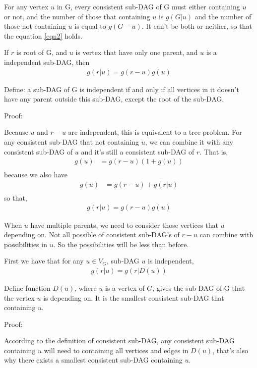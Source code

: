\documentclass[11pt]{article}
\begin{document}
	For any vertex $u$ in G, every consistent sub-DAG of G must either containing $u$ or not, and the number of those that containing $u$ is $g(G|u)$ and the number of those not containing $u$ is equal to $g(G-u)$. It can't be both or neither, so that the equation \ref{eqn2} holds.
	
	\bigskip
	If $r$ is root of G, and $u$ is vertex that have only one parent, and $u$ is a independent sub-DAG, then
	\begin{align} \label{eqn3}
		g(r|u) = g(r-u)g(u)
	\end{align}
	
	Define: a sub-DAG of G is independent if and only if all vertices in it doesn't have any parent outside this sub-DAG, except the root of the sub-DAG.
	
	\bigskip
	Proof:
	
	Because $u$ and $r-u$ are independent, this is equivalent to a tree problem. For any consistent sub-DAG that not containing $u$, we can combine it with any consistent sub-DAG of $u$ and it's still a consistent sub-DAG of $r$. That is,
	\begin{align*}
		g(u)&=g(r-u)(1+g(u))\\
	\end{align*}
	because we also have
	\begin{align*}
		g(u)&=g(r-u)+g(r|u)\\
	\end{align*}
	so that,
	\begin{align*}
		g(r|u) = g(r-u)g(u)
	\end{align*}
	
	\bigskip
	When $u$ have multiple parents, we need to consider those vertices that $u$ depending on. Not all possible of consistent sub-DAG's of $r-u$ can combine with possibilities in $u$. So the possibilities will be less than before.
	
	\bigskip
	First we have that for any $u \in V_G$, sub-DAG $u$ is independent,
	\begin{align}
		g(r|u) = g(r|D(u))
	\end{align}
	
	Define function $D(u)$, where $u$ is a vertex of $G$, gives the sub-DAG of G that the vertex $u$ is depending on. It is the smallest consistent sub-DAG that containing $u$.
	
	\bigskip
	Proof:
	
	According to the definition of consistent sub-DAG, any consistent sub-DAG containing $u$ will need to containing all vertices and edges in $D(u)$, that's also why there exists a smallest consistent sub-DAG containing $u$.
	
\end{document}
